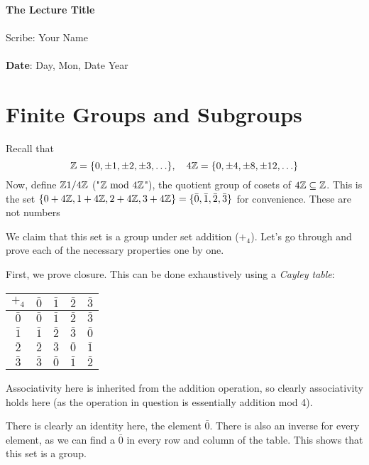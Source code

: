 \documentclass[11pt,twosided]{article}
\def\titlestring{The Lecture Title}
\def\scribestring{Your Name}
\def\datestring{Day, Mon, Date Year}
\begin{document}
\thispagestyle{plain}  %

\noindent
{\LARGE \textbf{\titlestring}}\\\\
%
{\Large Scribe: \scribestring}\\ \\
{\textbf{Date}: \datestring}


\noindent

\section{Finite Groups and Subgroups}
Recall that 
\[
	\mathbb Z = \{0, \pm 1, \pm 2, \pm 3, \ldots \}, \quad 4\mathbb Z = \{0, \pm 4, \pm 8, \pm 12, \ldots \}
\]
Now, define $\mathbb Z 1/4\mathbb Z$ ("$\mathbb Z \ \text{mod}\ 4\mathbb Z$"), the quotient group of cosets of $4\mathbb Z \subseteq \mathbb Z$. 
This is the set $\{0 + 4\mathbb Z, 1 + 4\mathbb Z, 2 + 4\mathbb Z, 3 + 4\mathbb Z \} = \{\bar{0}, \bar{1}, \bar{2}, \bar{3}\}$ for convenience. These are not numbers

We claim that this set is a group under set addition ($+_4$). Let's go through and prove each of the necessary properties one by one. 

First, we prove closure. This can be done exhaustively using a \textit{Cayley table}:
\begin{center}
\begin{tabular}{c | c c c c}
$+_4$ & $\bar 0$ & $\bar 1$ & $\bar 2$ & $\bar 3$ \\ \hline 
$\bar{0}$ & $\bar 0$ & $\bar 1$ & $\bar 2$ & $\bar 3$ \\ 
$\bar{1}$ & $\bar 1$ & $\bar 2$ & $\bar 3$ & $\bar 0$ \\ 
$\bar{2}$ & $\bar 2$ & $\bar 3$ & $\bar 0$ & $\bar 1$ \\ 
$\bar{3}$ & $\bar 3$ & $\bar 0$ & $\bar 1$ & $\bar 2$ \\ 
\end{tabular}
\end{center}


Associativity here is inherited from the addition operation, so clearly associativity holds here (as the operation in question is essentially addition mod 4). 

There is clearly an identity here, the element $\bar 0$. There is also an inverse for every element, as we can find a $\bar 0$ in every row and column of the table. This shows that this set is a group. 
\end{document}
